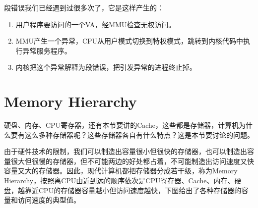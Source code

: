 段错误我们已经遇到过很多次了，它是这样产生的：


\begin{enumerate}

\item 用户程序要访问的一个VA，经MMU检查无权访问。

\item MMU产生一个异常，CPU从用户模式切换到特权模式，跳转到内核代码中执行异常服务程序。

\item 内核把这个异常解释为段错误，把引发异常的进程终止掉。
\end{enumerate}




\section{Memory Hierarchy}
%
硬盘、内存、CPU寄存器，还有本节要讲的Cache，这些都是存储器，计算机为什么要有这么多种存储器呢？这些存储器各自有什么特点？这是本节要讨论的问题。



由于硬件技术的限制，我们可以制造出容量很小但很快的存储器，也可以制造出容量很大但很慢的存储器，但不可能两边的好处都占着，不可能制造出访问速度又快容量又大的存储器。因此，现代计算机都把存储器分成若干级，称为Memory Hierarchy，按照离CPU由近到远的顺序依次是CPU寄存器、Cache、内存、硬盘，越靠近CPU的存储器容量越小但访问速度越快，下图给出了各种存储器的容量和访问速度的典型值。



